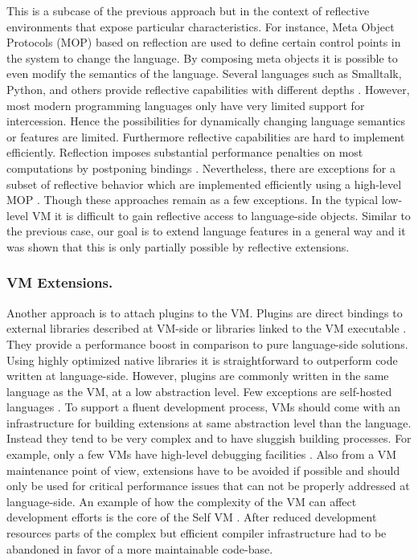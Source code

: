 This is a subcase of the previous approach but in the context of reflective environments that expose particular characteristics.
For instance, Meta Object Protocols (MOP) \cite{Kicz91a} based on reflection \cite{Maes87a} are used to define certain control points in the system to change the language.
By composing meta objects it is possible to even modify the semantics of the language. 
Several languages such as Smalltalk, Python, and others provide reflective capabilities with different depths \cite{Ande98a,Flan08a,Van10a}.
However, most modern programming languages only have very limited support for intercession.
Hence the possibilities for dynamically changing language semantics or features are limited. 
Furthermore reflective capabilities are hard to implement efficiently.
Reflection imposes substantial performance penalties on most computations by postponing bindings \cite{Male96a}. 
Nevertheless, there are exceptions for a subset of reflective behavior which are implemented efficiently using a high-level MOP \cite{Vran12a}.
Though these approaches remain as a few exceptions.
In the typical low-level VM it is difficult to gain reflective access to language-side objects.
Similar to the previous case, our goal is to extend language features in a general way and it was shown that this is only partially possible by reflective extensions. 


\subsubsection{VM Extensions.}

Another approach is to attach plugins to the VM.
Plugins are direct bindings to external libraries described at VM-side or libraries linked to the VM executable \cite[Ch.\ 5]{Blac09a}. 
They provide a performance boost in comparison to pure language-side solutions.
Using highly optimized native libraries it is straightforward to outperform code written at language-side.
However, plugins are commonly written in the same language as the VM, at a low abstraction level.
Few exceptions are self-hosted languages \cite{Unga05a,Wimm13a,Rigo06a}.
To support a fluent development process, VMs should come with an infrastructure for building extensions at same abstraction level than the language.
Instead they tend to be very complex and to have sluggish building processes. For example, only a few VMs have high-level debugging facilities \cite{Inga97a,Unga05a,Wimm13a}.
Also from a VM maintenance point of view, extensions have to be avoided if possible and should only be used for critical performance issues that can not be properly addressed at language-side.
An example of how the complexity of the VM can affect development efforts is the core of the Self VM \cite{Unga07a}.
After reduced development resources parts of the complex but efficient compiler infrastructure had to be abandoned in favor of a more maintainable code-base.

